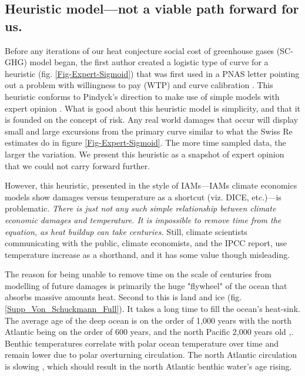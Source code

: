\documentclass{article}
\begin{document}
\subsection{Heuristic model---not a viable path forward for us.} Before any iterations of our heat conjecture social cost of greenhouse gases (SC-GHG) model began, the first author created a logistic type of curve for a heuristic (fig. \ref{Fig-Expert-Sigmoid}) that was first used in a PNAS letter pointing out a problem with willingness to pay (WTP) and curve calibration \cite{Keen2022EstimatesTippingCannotBeReconciled}.  This heuristic conforms to Pindyck's direction to make use of simple models with expert opinion \cite{Pindyck2017UseandMisuse}. What is good about this heuristic model is simplicity, and that it is founded on the concept of risk. Any real world damages that occur will display small and large excursions from the primary curve similar to what the Swiss Re estimates do in figure \ref{Fig-Expert-Sigmoid}. The more time sampled data, the larger the variation. We present this heuristic as a snapshot of expert opinion that we could not carry forward further. 


However, this heuristic, presented in the style of IAMs---IAMs climate economics models show damages versus temperature as a shortcut (viz. DICE, etc.)---is problematic. \emph{There is just not any such simple relationship between climate economic damages and temperature. It is impossible to remove time from the equation, as heat buildup can take centuries.} Still, climate scientists communicating with the public, climate economists, and the IPCC report, use temperature increase as a shorthand, and it has some value though misleading. 

The reason for being unable to remove time on the scale of centuries from modelling of future damages is primarily the huge "flywheel" of the ocean that absorbs massive amounts heat. Second to this is land and ice (fig. \ref{Supp_Von_Schuckmann_Full}). It takes a long time to fill the ocean's heat-sink. The average age of the deep ocean is on the order of 1,000 years with the north Atlantic being on the order of 600 years, and the north Pacific 2,000 years old \cite[Fig 1, p. 3]{Matsumoto2007RadiocarbonCirculationAgeOceans},\cite{Cimoli2023CFCsSF6_GlobalOcean8Decades}. Benthic temperatures correlate with polar ocean temperature over time \cite[fig. 6]{Valdes2021DeepOceanTempsThruTime} and remain lower due to polar overturning circulation. The north Atlantic circulation is slowing \cite{Ditlevsen2023AMOCcollapse}, which should result in the north Atlantic benthic water's age rising. 
\end{document}
